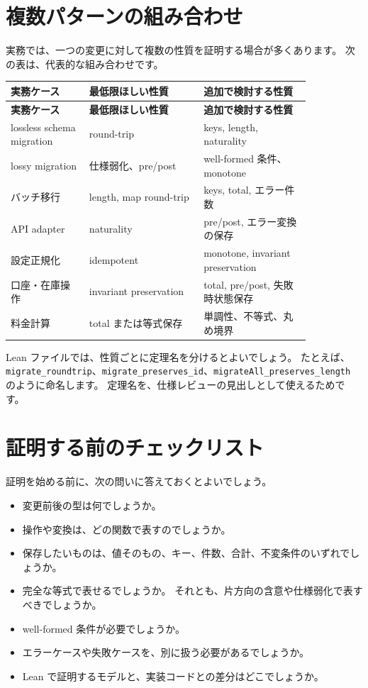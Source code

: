 \section{複数パターンの組み合わせ}

実務では、一つの変更に対して複数の性質を証明する場合が多くあります。
次の表は、代表的な組み合わせです。

\begin{longtable}{@{}p{0.22\linewidth}p{0.32\linewidth}p{0.30\linewidth}@{}}
\toprule
\textbf{実務ケース} & \textbf{最低限ほしい性質} & \textbf{追加で検討する性質} \\
\midrule
\endfirsthead
\toprule
\textbf{実務ケース} & \textbf{最低限ほしい性質} & \textbf{追加で検討する性質} \\
\midrule
\endhead
lossless schema migration & round-trip & keys, length, naturality \\
lossy migration & 仕様弱化、pre/post & well-formed 条件、monotone \\
バッチ移行 & length, map round-trip & keys, total, エラー件数 \\
API adapter & naturality & pre/post, エラー変換の保存 \\
設定正規化 & idempotent & monotone, invariant preservation \\
口座・在庫操作 & invariant preservation & total, pre/post, 失敗時状態保存 \\
料金計算 & total または等式保存 & 単調性、不等式、丸め境界 \\
\bottomrule
\end{longtable}

Lean ファイルでは、性質ごとに定理名を分けるとよいでしょう。
たとえば、\texttt{migrate\_roundtrip}、\texttt{migrate\_preserves\_id}、\texttt{migrateAll\_preserves\_length} のように命名します。
定理名を、仕様レビューの見出しとして使えるためです。

\section{証明する前のチェックリスト}

証明を始める前に、次の問いに答えておくとよいでしょう。

\begin{itemize}
\item 変更前後の型は何でしょうか。
\item 操作や変換は、どの関数で表すのでしょうか。
\item 保存したいものは、値そのもの、キー、件数、合計、不変条件のいずれでしょうか。
\item 完全な等式で表せるでしょうか。
それとも、片方向の含意や仕様弱化で表すべきでしょうか。
\item well-formed 条件が必要でしょうか。
\item エラーケースや失敗ケースを、別に扱う必要があるでしょうか。
\item Lean で証明するモデルと、実装コードとの差分はどこでしょうか。
\end{itemize}


